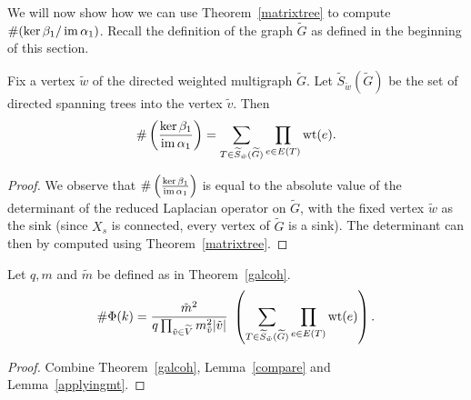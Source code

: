 We will now show how we can use Theorem~\ref{matrixtree} to compute $\# (\ker{\beta_1}/\operatorname{im} \alpha_1)$. Recall the definition of the graph $\tilde{G}$ as defined in the beginning of this section.
\begin{lemma}\label{applyingmt}
 Fix a vertex $\tilde{w}$ of the directed weighted multigraph $\widetilde{G}$. Let $\widetilde{S}_{\tilde{w}}(\widetilde{G})$ be the set of directed spanning trees into the vertex $\tilde{v}$. Then
 \[ \# \left( \frac{\ker{\beta_1}}{\operatorname{im}{\alpha_1}} \right) = \sum_{T \in \widetilde{S}_{\tilde{w}}(\widetilde{G})} \prod_{e \in E(T)} \operatorname{wt}(e)  .\]
\end{lemma}
\begin{proof}
 We observe that $\# \left( \tfrac{\ker{\beta_1}}{\operatorname{im}{\alpha_1}} \right)$ is equal to the absolute value of the determinant of the reduced Laplacian operator on $\widetilde{G}$, with the fixed vertex $\tilde{w}$ as the sink (since $X_s$ is connected, every vertex of $\widetilde{G}$ is a sink). The determinant can then by computed using Theorem~\ref{matrixtree}.
\end{proof}

\begin{thm}\label{tamnum}
Let $q, m$ and $\tilde{m}$ be defined as in Theorem~\ref{galcoh}.
\begin{equation*}
 \# \Phi(k) = \frac{\tilde{m}^2}{q\prod_{\tilde{v} \in \widetilde{V}} m_{\tilde{v}}^2 |\tilde{v}|} \ \left( \sum_{T \in \widetilde{S}_{\tilde{w}}(\widetilde{G})} \prod_{e \in E(T)} \operatorname{wt}(e) \right)   .
\end{equation*} 
\end{thm}
\begin{proof}
 Combine Theorem~\ref{galcoh}, Lemma~\ref{compare} and Lemma~\ref{applyingmt}.
\end{proof}